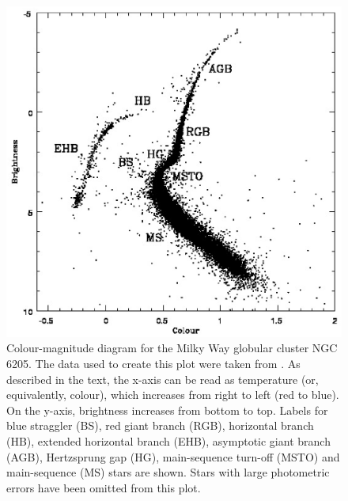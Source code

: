 \begin{figure} [!h]
  \begin{center}
 \includegraphics[scale=0.5]{Chapter-1/thesis_fig2.ps}
    \caption[CMD for the Milky Way globular cluster NGC
    6205]{Colour-magnitude diagram for the Milky Way globular cluster 
      NGC 6205.  The data used to create this plot were taken from
      \citet{sarajedini07}.  %
      As described in the text, the x-axis can be read as temperature
      (or, equivalently, colour), 
      which increases from right to left (red to blue).  On the
      y-axis, brightness increases from bottom to top.  
      Labels for blue straggler (BS), red giant branch (RGB), horizontal
      branch (HB), extended horizontal branch (EHB), asymptotic giant
      branch (AGB), Hertzsprung gap (HG), main-sequence turn-off (MSTO) and
      main-sequence (MS) stars are shown.  Stars with large photometric errors
      have been omitted from this plot. 
      \label{fig:CMD}}
    \end{center}
\end{figure}

